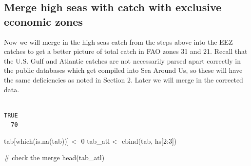 \documentclass[
]{article}
\newenvironment{Shaded}{\begin{snugshade}}{\end{snugshade}}
\newcommand{\CommentTok}[1]{\textcolor[rgb]{0.37,0.37,0.37}{#1}}
\newcommand{\DecValTok}[1]{\textcolor[rgb]{0.68,0.00,0.00}{#1}}
\newcommand{\FunctionTok}[1]{\textcolor[rgb]{0.28,0.35,0.67}{#1}}
\newcommand{\NormalTok}[1]{\textcolor[rgb]{0.00,0.23,0.31}{#1}}
\newcommand{\OtherTok}[1]{\textcolor[rgb]{0.00,0.23,0.31}{#1}}
\newcommand{\SpecialCharTok}[1]{\textcolor[rgb]{0.37,0.37,0.37}{#1}}
\newcommand{\StringTok}[1]{\textcolor[rgb]{0.13,0.47,0.30}{#1}}
\begin{document}
\subsection{Merge high seas with catch with exclusive economic
zones}\label{merge-high-seas-with-catch-with-exclusive-economic-zones}

Now we will merge in the high seas catch from the steps above into the
EEZ catches to get a better picture of total catch in FAO zones 31 and
21. Recall that the U.S. Gulf and Atlantic catches are not necessarily
parsed apart correctly in the public databases which get compiled into
Sea Around Us, so these will have the same deficiencies as noted in
Section 2. Later we will merge in the corrected data.

\begin{Shaded}
\end{Shaded}

\begin{verbatim}

TRUE 
  70 
\end{verbatim}

\begin{Shaded}
\begin{Highlighting}[]
\NormalTok{tab[}\FunctionTok{which}\NormalTok{(}\FunctionTok{is.na}\NormalTok{(tab))] }\OtherTok{\textless{}{-}} \DecValTok{0}
\NormalTok{tab\_atl }\OtherTok{\textless{}{-}} \FunctionTok{cbind}\NormalTok{(tab, hs[}\DecValTok{2}\SpecialCharTok{:}\DecValTok{3}\NormalTok{])}

\CommentTok{\# check the merge}
\FunctionTok{head}\NormalTok{(tab\_atl)}
\end{Highlighting}
\end{Shaded}
\end{document}
